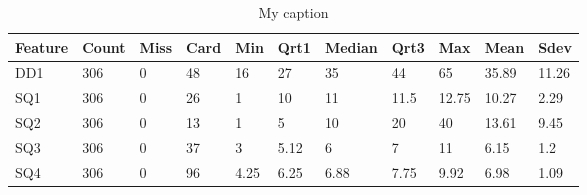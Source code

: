 \documentclass[10pt,letterpaper,oneside]{article}
\begin{document}
	\begin{table}[]
		\centering
		\caption{My caption}
		\label{my-label}
		\begin{tabular}{lllllllllll}
			\hline
			\textbf{Feature} & \textbf{Count} & \textbf{Miss} & \textbf{Card} & \textbf{Min} & \textbf{Qrt1} & \textbf{Median} & \textbf{Qrt3} & \textbf{Max} & \textbf{Mean} & \textbf{Sdev} \\ \hline
			DD1              & 306            & 0             & 48            & 16           & 27            & 35              & 44            & 65           & 35.89         & 11.26         \\
			SQ1              & 306            & 0             & 26            & 1            & 10            & 11              & 11.5          & 12.75        & 10.27         & 2.29          \\
			SQ2              & 306            & 0             & 13            & 1            & 5             & 10              & 20            & 40           & 13.61         & 9.45          \\
			SQ3              & 306            & 0             & 37            & 3            & 5.12          & 6               & 7             & 11           & 6.15          & 1.2           \\
			SQ4              & 306            & 0             & 96            & 4.25         & 6.25          & 6.88            & 7.75          & 9.92         & 6.98          & 1.09          \\ \hline
		\end{tabular}
	\end{table}
\end{document}
